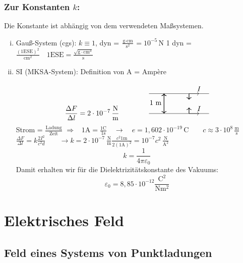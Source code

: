 \documentclass[titlepage,11pt,a4paper,ngerman]{report}
\newcommand{\tx}[1]{\textrm{#1}}
\renewcommand{\epsilon}{\varepsilon}
\renewcommand{\paragraph}[1]{\subsubsection{#1}}
\begin{document}
\paragraph{Zur Konstanten $k$:}
Die Konstante ist abhängig von dem verwendeten Maßsystemen.
\begin{enumerate}[i)]
	\item Gauß-System (cgs): $k \equiv 1$, dyn = $\frac{\textrm{g}\cdot \textrm{cm}}{\textrm{s}^2} = 10^{-5}\,\textrm{N}$
	1 dyn = $\frac{(1\textrm{ESE})^2}{\textrm{cm}^2} \quad 1\textrm{ESE} = \frac{\sqrt{\textrm{g}\cdot \textrm{cm}^3}}{\textrm{s}}$
	\item SI (MKSA-System): Definition von A = Amp\`ere 
	
	
	
	\vspace{-15pt}
	$$\frac{\Delta F}{\Delta l}= 2 \cdot 10^{-7}\,\frac{\textrm{N}}{\textrm{m}} \qquad \qquad \begin{tikzpicture}
	\draw (0,0) -- (3,0);
	\draw (0,1) -- (3,1);
	\draw[thick,<->] (.75,0) -- (.75,1) node[anchor=north east,yshift=-6pt] {1 m};
	\draw[thick,->] (2,0) -- (2,.3);
	\draw[thick,->] (2,1) -- (2,.7);
	\draw[->] (2,0) -- (2.5,0) node[above] {$ I $};
	\draw[->] (2,1) -- (2.5,1) node[above] {$ I $};
	\end{tikzpicture}$$
	Strom = $\frac{\textrm{Ladung}}{\textrm{Zeit}}$ $\Rightarrow$  \ 
	$
	1 \tx{A} = \frac{1 \tx{C}}{1 \tx{s}} \quad \rightarrow \quad e = 1{,}602 \cdot 10^{-19} \, \tx{C} \qquad c \approx 3 \cdot 10^{8} \, \frac{\tx{m}}{\tx{s}}
	$\\[5pt]
	$
	\frac{\Delta F}{\Delta l} = k \frac{2 I^2}{c^2 d} \qquad \rightarrow k = 2 \cdot 10^{-7} \ \frac{\tx{N}}{\tx{m}} \frac{c^2 1 \tx{m}}{2 (1 \tx{A})^2} = 10^{-7} c^2 \, \frac{\tx{N}}{\tx{A}^2}
	$
	\begin{equation*}
	k = \frac{1}{4 \pi \epsilon_0}
	\end{equation*}
	Damit erhalten wir für die Dielektrizitätskonstante des Vakuums:
	\begin{equation*}
	\epsilon_0 = 8{,}85 \cdot 10^{-12} \frac{\tx{C}^2}{\tx{N} \tx{m}^2}
	\end{equation*}
\end{enumerate}


\section{Elektrisches Feld}
\subsection{Feld eines Systems von Punktladungen}
\end{document}
